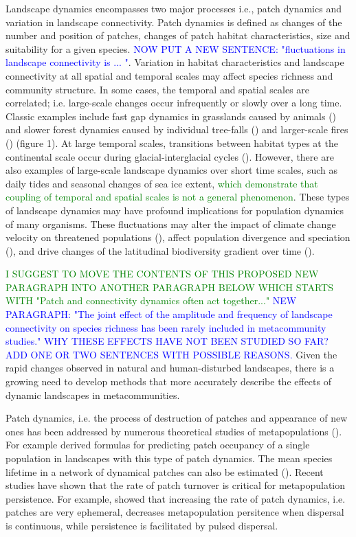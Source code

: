 \documentclass[12pt]{article}
\newcommand{\GM}[1]{\textcolor{Blue}{#1}}
\newcommand{\JK}[1]{\textcolor{Green}{#1}}
\begin{document}
Landscape dynamics encompasses two major processes i.e., patch dynamics and variation in landscape connectivity. Patch dynamics is defined as changes of the number and position of patches, changes of patch habitat characteristics, size and suitability for a given species. \GM{NOW PUT A NEW SENTENCE: "fluctuations in landscape connectivity is ... "}. Variation in habitat characteristics and landscape connectivity at all spatial and temporal scales may affect species richness and community structure. In some cases, the temporal and spatial scales are correlated; i.e. large-scale changes occur infrequently or slowly over a long time. Classic examples include fast gap dynamics in grasslands caused by animals (\cite{WhickerDetling1988, HobbsMooney1991, MiltonEtAl1997}) and slower forest dynamics caused by individual tree-falls (\cite{Goldblum1997}) and larger-scale fires (\cite{VanWagnerEtAl2006, WhelanEtAl2013}) (figure 1). At large temporal scales, transitions between habitat types at the continental scale occur during glacial-interglacial cycles (\cite{WerneckEtAl2011}). However, there are also examples of large-scale landscape dynamics over short time scales, such as daily tides and seasonal changes of sea ice extent, \JK{which demonstrate that coupling of temporal and spatial scales is not a general phenomenon}. These types of landscape dynamics may have profound implications for population dynamics of many organisms. These fluctuations may alter the impact of climate change velocity on threatened populations (\cite{loarieetal2009}), affect population divergence and speciation (\cite{aguileetal2011}), and drive changes of the latitudinal biodiversity gradient over time (\cite{mannionetal2014}).

\JK{I SUGGEST TO MOVE THE CONTENTS OF THIS PROPOSED NEW PARAGRAPH INTO ANOTHER PARAGRAPH BELOW WHICH STARTS WITH "Patch and connectivity dynamics often act together..."}
\GM{NEW PARAGRAPH: "The joint effect of the amplitude and frequency of landscape connectivity on species richness has been rarely included in metacommunity studies." WHY THESE EFFECTS HAVE NOT BEEN STUDIED SO FAR? ADD ONE OR TWO SENTENCES WITH POSSIBLE REASONS.} Given the rapid changes observed in natural and human-disturbed landscapes, there is a growing need to develop methods that more accurately describe the effects of dynamic landscapes in metacommunities.

Patch dynamics, i.e. the process of destruction of patches and appearance of new ones has been addressed by numerous theoretical studies of metapopulations (\cite{Hanski1999,Cornell&Ovaskainen2008,DrechslerJohst2010}). For example \cite{Hanski1999} derived formulas for predicting patch occupancy of a single population in landscapes with this type of patch dynamics. The mean species lifetime in a network of dynamical patches can also be estimated (\cite{DrechslerJohst2010}). Recent studies have shown that the rate of patch turnover is critical for metapopulation persistence. For example, \citet{reigadaetal2015} showed that increasing the rate of patch dynamics, i.e. patches are very ephemeral, decreases metapopulation persitence when dispersal is continuous, while persistence is facilitated by pulsed dispersal. 
\end{document}
